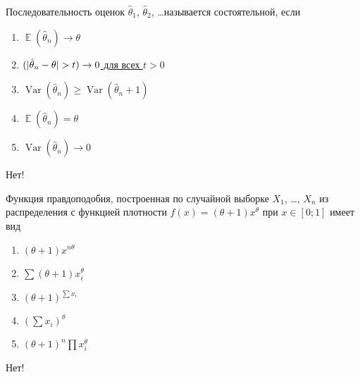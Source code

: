 \documentclass[t]{beamer}
\DeclareMathOperator{\Var}{Var}
\DeclareMathOperator{\E}{\mathbb{E}}
\let\P\relax
\DeclareMathOperator{\P}{\mathbb{P}}
\begin{document}
 \begin{frame} \label{39-No} 
\begin{block}{39} 

Последовательность оценок $\hat{\theta}_1$, $\hat{\theta}_2$, \ldots называется состоятельной, если
 


 \end{block} 
\begin{enumerate} 
\item[] \hyperlink{39-No}{\beamergotobutton{} $\E(\hat\theta_n)\to \theta$}
\item[] \hyperlink{39-Yes}{\beamergotobutton{} $\P(|\hat\theta_n - \theta |>t)\to 0$ для всех $t>0$}
\item[] \hyperlink{39-No}{\beamergotobutton{} $\Var(\hat\theta_n)\geq \Var(\hat\theta_n+1)$}
\item[] \hyperlink{39-No}{\beamergotobutton{} $\E(\hat\theta_n)=\theta$}
\item[] \hyperlink{39-No}{\beamergotobutton{} $\Var(\hat\theta_n)\to 0$}
\end{enumerate} 

 \alert{Нет!} 
\end{frame} 


 \begin{frame} \label{40-No} 
\begin{block}{40} 

Функция правдоподобия, построенная по случайной выборке $X_1$, \ldots, $X_n$ из распределения с функцией плотности $f(x)=(\theta+1)x^{\theta}$ при $x\in [0;1]$ имеет вид
 


 \end{block} 
\begin{enumerate} 
\item[] \hyperlink{40-No}{\beamergotobutton{} $(\theta+1)x^{n\theta}$}
\item[] \hyperlink{40-No}{\beamergotobutton{} $\sum (\theta+1)x_i^{\theta}$}
\item[] \hyperlink{40-No}{\beamergotobutton{} $(\theta+1)^{\sum x_i}$}
\item[] \hyperlink{40-No}{\beamergotobutton{} $(\sum x_i)^{\theta}$}
\item[] \hyperlink{40-Yes}{\beamergotobutton{} $(\theta+1)^n\prod x_i^{\theta}$}
\end{enumerate} 

 \alert{Нет!} 
\end{frame} 
\end{document}
